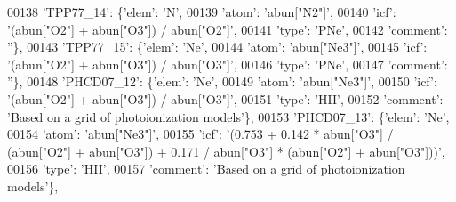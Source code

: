\begin{DoxyCode}
00138                          \textcolor{stringliteral}{'TPP77\_14'}: \{\textcolor{stringliteral}{'elem'}: \textcolor{stringliteral}{'N'},
00139                                       \textcolor{stringliteral}{'atom'}: \textcolor{stringliteral}{'abun["N2"]'},
00140                                       \textcolor{stringliteral}{'icf'}: \textcolor{stringliteral}{'(abun["O2"] + abun["O3"]) / abun["O2"]'},
00141                                       \textcolor{stringliteral}{'type'}: \textcolor{stringliteral}{'PNe'},
00142                                       \textcolor{stringliteral}{'comment'}: \textcolor{stringliteral}{''}\},
00143                          \textcolor{stringliteral}{'TPP77\_15'}: \{\textcolor{stringliteral}{'elem'}: \textcolor{stringliteral}{'Ne'},
00144                                       \textcolor{stringliteral}{'atom'}: \textcolor{stringliteral}{'abun["Ne3"]'},
00145                                       \textcolor{stringliteral}{'icf'}: \textcolor{stringliteral}{'(abun["O2"] + abun["O3"]) / abun["O3"]'},
00146                                       \textcolor{stringliteral}{'type'}: \textcolor{stringliteral}{'PNe'},
00147                                       \textcolor{stringliteral}{'comment'}: \textcolor{stringliteral}{''}\},
00148                          \textcolor{stringliteral}{'PHCD07\_12'}: \{\textcolor{stringliteral}{'elem'}: \textcolor{stringliteral}{'Ne'},
00149                                        \textcolor{stringliteral}{'atom'}: \textcolor{stringliteral}{'abun["Ne3"]'},
00150                                        \textcolor{stringliteral}{'icf'}: \textcolor{stringliteral}{'(abun["O2"] + abun["O3"]) / abun["O3"]'},
00151                                        \textcolor{stringliteral}{'type'}: \textcolor{stringliteral}{'HII'},
00152                                        \textcolor{stringliteral}{'comment'}: \textcolor{stringliteral}{'Based on a grid of photoionization models'}\},
00153                          \textcolor{stringliteral}{'PHCD07\_13'}: \{\textcolor{stringliteral}{'elem'}: \textcolor{stringliteral}{'Ne'},
00154                                        \textcolor{stringliteral}{'atom'}: \textcolor{stringliteral}{'abun["Ne3"]'},
00155                                        \textcolor{stringliteral}{'icf'}: \textcolor{stringliteral}{'(0.753 + 0.142 * abun["O3"] / (abun["O2"] + abun["O3"]) +
       0.171 / abun["O3"] * (abun["O2"] + abun["O3"]))'},
00156                                        \textcolor{stringliteral}{'type'}: \textcolor{stringliteral}{'HII'},
00157                                        \textcolor{stringliteral}{'comment'}: \textcolor{stringliteral}{'Based on a grid of photoionization models'}\},

\end{DoxyCode}
